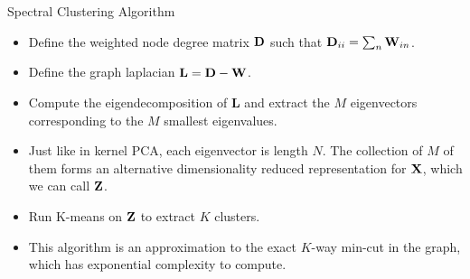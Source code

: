 \documentclass[serif,xcolor=pdftex,dvipsnames,table,hyperref={bookmarks=false,breaklinks}]{beamer}
\begin{document}
\begin{frame}[t]{Spectral Clustering Algorithm}

\begin{itemize}
\item Define the weighted node degree matrix ${\mathbf{D}}$ such that ${\mathbf{D}}_{ii} 
= \sum_n \mathbf{W}_{in}$.

\pause\item Define the graph laplacian ${\mathbf{L}} = {\mathbf{D}} - {\mathbf{W}}$.

\pause\item Compute the eigendecomposition of $\mathbf{L}$ and extract the 
$M$ eigenvectors corresponding to the $M$ smallest eigenvalues. 

\pause\item Just like in kernel PCA, each eigenvector is length $N$. The 
collection of $M$ of them forms an alternative dimensionality reduced 
representation for ${\mathbf{X}}$, which we can call ${\mathbf{Z}}$.

\pause\item Run K-means on ${\mathbf{Z}}$ to extract $K$ clusters.

\pause\item This algorithm is an approximation to the exact $K$-way min-cut in 
the graph, which has exponential complexity to compute. 

\end{itemize} 

\end{frame}
\end{document}
